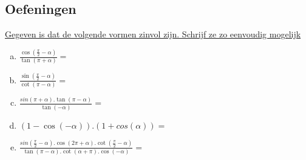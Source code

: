 \documentclass[a4paper,12pt]{article}
\begin{document}
\newpage
\subsection{Oefeningen}
\underline{Gegeven is dat de volgende vormen zinvol zijn. Schrijf ze zo eenvoudig mogelijk}

\begin{enumerate}[(a)]
  \item $\frac{\cos(\frac{\pi}{2}-\alpha)}{\tan(\pi+\alpha)}=$ 
  \item $\frac{\sin(\frac{\pi}{2}-\alpha)}{\cot(\pi-\alpha)}=$ 
  \item $\frac{sin(\pi+\alpha).\tan(\pi-\alpha)}{\tan(-\alpha)}=$ 
  \item $(1-\cos(-\alpha)).(1+cos(\alpha))=$ 
  \item $\frac{sin(\frac{\pi}{2}-\alpha).\cos(2\pi+\alpha).\cot(\frac{\pi}{2}-\alpha)}{\tan(\pi-\alpha).\cot(\alpha+\pi).\cos(-\alpha)}=$ 
\end{enumerate}
\end{document}
